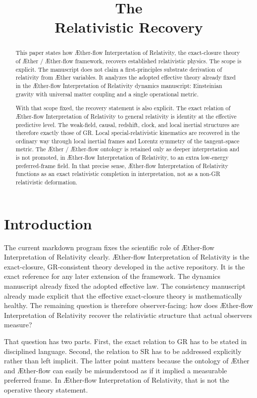 \documentclass[11pt]{article}
\title{\textbf{The \TheoryName{}}\\[0.4em]
\large Relativistic Recovery}
\author{}
\date{}
\newcommand{\Aether}{\AE{}ther}
\newcommand{\Aflow}{\AE{}ther-flow}
\newcommand{\TheoryName}{\Aflow{} Interpretation of Relativity}
\newcommand{\TheoryProgram}{\Aether{} / \Aflow{} framework}
\begin{document}
\maketitle

\begin{abstract}
This paper states how \TheoryName{}, the exact-closure theory of \TheoryProgram{}, recovers established relativistic physics. The scope is explicit. The manuscript does not claim a first-principles substrate derivation of relativity from \Aether{} variables. It analyzes the adopted effective theory already fixed in the \TheoryName{} dynamics manuscript: Einsteinian gravity with universal matter coupling and a single operational metric.

With that scope fixed, the recovery statement is also explicit. The exact relation of \TheoryName{} to general relativity is identity at the effective predictive level. The weak-field, causal, redshift, clock, and local inertial structures are therefore exactly those of GR. Local special-relativistic kinematics are recovered in the ordinary way through local inertial frames and Lorentz symmetry of the tangent-space metric. The \Aether{} / \Aflow{} ontology is retained only as deeper interpretation and is not promoted, in \TheoryName{}, to an extra low-energy preferred-frame field. In that precise sense, \TheoryName{} functions as an exact relativistic completion in interpretation, not as a non-GR relativistic deformation.
\end{abstract}

\section{Introduction}

The current markdown program fixes the scientific role of \TheoryName{} clearly. \TheoryName{} is the exact-closure, GR-consistent theory developed in the active repository. It is the exact reference for any later extension of the framework. The dynamics manuscript already fixed the adopted effective law. The consistency manuscript already made explicit that the effective exact-closure theory is mathematically healthy. The remaining question is therefore observer-facing: how does \TheoryName{} recover the relativistic structure that actual observers measure?

That question has two parts. First, the exact relation to GR has to be stated in disciplined language. Second, the relation to SR has to be addressed explicitly rather than left implicit. The latter point matters because the ontology of \Aether{} and \Aflow{} can easily be misunderstood as if it implied a measurable preferred frame. In \TheoryName{}, that is not the operative theory statement.
\end{document}
